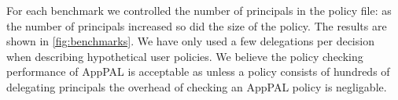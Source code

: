 \documentclass[]{llncs}
\begin{document}
For each benchmark we controlled the number of principals in the policy file:
  as the number of principals increased so did the size of the policy.
The results are shown in \autoref{fig:benchmarks}.
We have only used a few delegations per decision when describing hypothetical user policies.
We believe the policy checking performance of AppPAL is acceptable as unless a policy consists of hundreds of delegating principals the overhead of checking an AppPAL policy is negligable.

\end{document}
